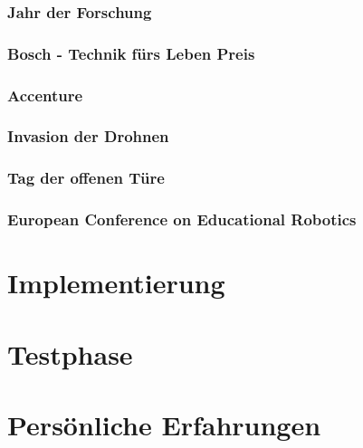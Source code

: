     \subsubsection{Jahr der Forschung}

    \subsubsection{Bosch - Technik fürs Leben Preis}

    \subsubsection{Accenture}

    \subsubsection{Invasion der Drohnen}

    \subsubsection{Tag der offenen Türe}

    \subsubsection{European Conference on Educational Robotics}

\section{Implementierung}

\section{Testphase}

\section{Persönliche Erfahrungen}
